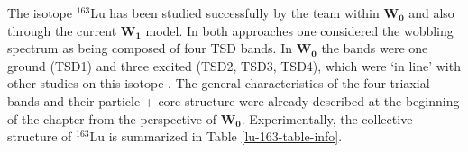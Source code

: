 The isotope $^{163}$Lu has been studied successfully by the team within $\mathbf{W_0}$ and also through the current $\mathbf{W_1}$ model. In both approaches one considered the wobbling spectrum as being composed of four TSD bands. In $\mathbf{W_0}$ the bands were one ground (TSD1) and three excited (TSD2, TSD3, TSD4), which were `in line' with other studies on this isotope \cite{schonwasser2003one,jensen2004coexisting,tanabe2008selection}. The general characteristics of the four triaxial bands and their particle + core structure were already described at the beginning of the chapter from the perspective of $\mathbf{W_0}$. Experimentally, the collective structure of $^{163}$Lu is summarized in Table \ref{lu-163-table-info}.
\begin{table}
    \centering
    \caption{The spin, parity, and signature assignments for $^{163}$Lu taken from experimental measurements \cite{reich2010nuclear}. Concerning the notation $\pi(l_j)$, it signifies an odd proton in the $l$-orbital with angular momentum $j$. The last two columns represent the key difference between the formalisms $\mathbf{W_0}$ and $\mathbf{W_1}$.}
    \label{lu-163-table-info}
\end{table}


